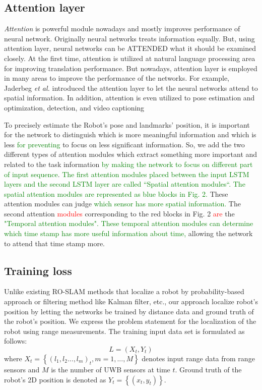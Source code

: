 \documentclass{ieeeaccess}
\begin{document}
\subsection{Attention layer}

\textit{Attention} is powerful module nowadays and mostly improves performance of neural network. Originally neural networks treats information equally. But, using attention layer, neural networks can be ATTENDED what it should be examined closely. At the first time, attention is utilized at natural language processing area for improving translation performance\cite{luong2015effective}. But nowadays, attention layer is employed in many areas to improve the performance of the networks. For example, Jaderbeg \textit{et al.}\cite{jaderberg2015spatial} introduced the attention layer to let the neural networks attend to spatial information. In addition, attention is even utilized to pose estimation and optimization\cite{parisotto2018global}, detection\cite{zhu2018towards}, and video captioning\cite{xu2017learning} 

To precisely estimate the Robot’s pose and landmarks’ position, it is important for the network to distinguish which is more meaningful information and which is less \textcolor{green}{for preventing} to focus on less significant information. So, we add the two different types of attention modules \cite{luong2015effective} which extract something more important and related to the task information \textcolor{green}{by making the network to focus on different part of input sequence}. \textcolor{green}{The first attention modules placed between the input LSTM layers and the second LSTM layer are called “Spatial attention modules“. The spatial attention modules are represented as blue blocks in Fig. 2.} These attention modules can judge \textcolor{green}{which sensor has more spatial information.} The second attention \textcolor{red}{modules} corresponding to the red blocks in Fig. 2 \textcolor{red}{are} the \textcolor{green}{"Temporal attention modules". These temporal attention modules can determine which time stamp has more useful information about time,} allowing the network to attend that time stamp more.  

\subsection{Training loss}

 Unlike existing RO-SLAM methods that localize a robot by probability-based approach or filtering method like Kalman filter, etc., our approach localize  robot's position by letting the networks be trained by distance data and ground truth of the robot's position. We express the problem statement for the localization of the robot using range measurements. The training input data set is formulated as follows: 
\begin{equation}
L = {(X_t, Y_t)} 
\end{equation}
where $X_t = \left\{(l_1, l_2... , l_m)_t, m = 1,...,M \right \}$ denotes input range data from range sensors and $M$ is the number of UWB sensors at time $t$. Ground truth of the robot's 2D position is denoted as $Y_t = \left\{(x_t, y_t)\right \}$.
\end{document}
